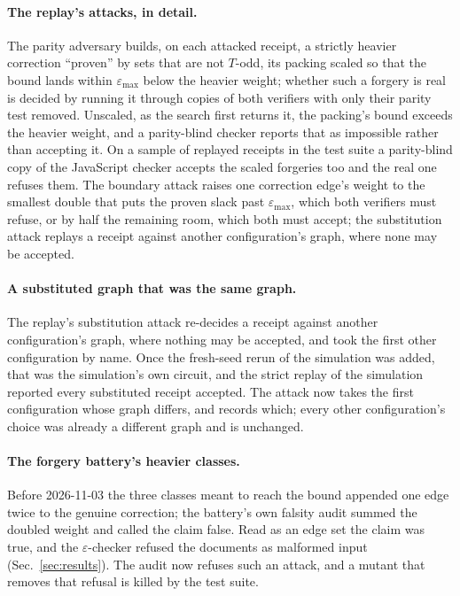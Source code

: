 \documentclass[aps,pra,twocolumn,superscriptaddress,nofootinbib,longbibliography,floatfix]{revtex4-2}
\newcommand{\eps}{\varepsilon}
\newcommand{\T}{T}
\begin{document}
\paragraph*{The replay's attacks, in detail.} The parity adversary builds, on each attacked receipt, a strictly heavier correction ``proven'' by sets that are not $\T$-odd, its packing scaled so that the bound lands within $\eps_{\max}$ below the heavier weight; whether such a forgery is real is decided by running it through copies of both verifiers with only their parity test removed. Unscaled, as the search first returns it, the packing's bound exceeds the heavier weight, and a parity-blind checker reports that as impossible rather than accepting it. On a sample of replayed receipts in the test suite a parity-blind copy of the JavaScript checker accepts the scaled forgeries too and the real one refuses them. The boundary attack raises one correction edge's weight to the smallest double that puts the proven slack past $\eps_{\max}$, which both verifiers must refuse, or by half the remaining room, which both must accept; the substitution attack replays a receipt against another configuration's graph, where none may be accepted.

\paragraph*{A substituted graph that was the same graph.} The replay's substitution attack re-decides a receipt against another configuration's graph, where nothing may be accepted, and took the first other configuration by name. Once the fresh-seed rerun of the simulation was added, that was the simulation's own circuit, and the strict replay of the simulation reported every substituted receipt accepted. The attack now takes the first configuration whose graph differs, and records which; every other configuration's choice was already a different graph and is unchanged.

\paragraph*{The forgery battery's heavier classes.} Before 2026-11-03 the three classes meant to reach the bound appended one edge twice to the genuine correction; the battery's own falsity audit summed the doubled weight and called the claim false. Read as an edge set the claim was true, and the $\eps$-checker refused the documents as malformed input (Sec.~\ref{sec:results}). The audit now refuses such an attack, and a mutant that removes that refusal is killed by the test suite.
\end{document}
